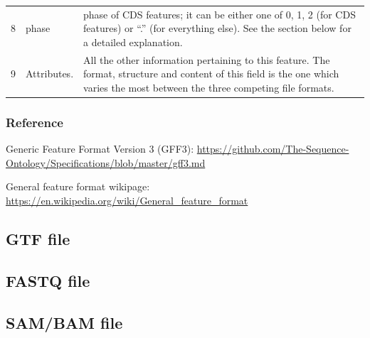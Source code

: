 \documentclass[]{book}
\begin{document}
\begin{longtable}[]{@{}lll@{}}
\begin{minipage}[t]{0.03\columnwidth}
8\strut
\end{minipage} & \begin{minipage}[t]{0.03\columnwidth}\raggedright
phase\strut
\end{minipage} & \begin{minipage}[t]{0.85\columnwidth}\raggedright
phase of CDS features; it can be either one of 0, 1, 2 (for CDS features) or ``.'' (for everything else). See the section below for a detailed explanation.\strut
\end{minipage}\tabularnewline
\begin{minipage}[t]{0.03\columnwidth}\raggedright
9\strut
\end{minipage} & \begin{minipage}[t]{0.03\columnwidth}\raggedright
Attributes.\strut
\end{minipage} & \begin{minipage}[t]{0.85\columnwidth}\raggedright
All the other information pertaining to this feature. The format, structure and content of this field is the one which varies the most between the three competing file formats.\strut
\end{minipage}\tabularnewline
\bottomrule
\end{longtable}

\hypertarget{reference}{%
\subsubsection{Reference}\label{reference}}

Generic Feature Format Version 3 (GFF3): \url{https://github.com/The-Sequence-Ontology/Specifications/blob/master/gff3.md}

General feature format wikipage: \url{https://en.wikipedia.org/wiki/General_feature_format}

\hypertarget{gtf-file}{%
\subsection{GTF file}\label{gtf-file}}

\hypertarget{fastq-file}{%
\subsection{FASTQ file}\label{fastq-file}}

\hypertarget{sambam-file}{%
\subsection{SAM/BAM file}\label{sambam-file}}
\end{document}
